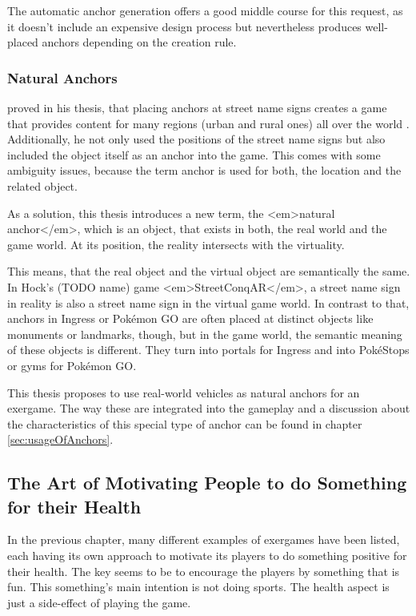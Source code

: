 The automatic anchor generation offers a good middle course for this request, as it doesn’t include an expensive design process but nevertheless produces well-placed anchors depending on the creation rule.

\subsubsection{Natural Anchors}
\citeauthor{hock2014augmented} proved in his thesis, that placing anchors at street name signs creates a game that provides content for many regions (urban and rural ones) all over the world \cite{hock2014augmented}. Additionally, he not only used the positions of the street name signs but also included the object itself as an anchor into the game. This comes with some ambiguity issues, because the term anchor is used for both, the location and the related object.

As a solution, this thesis introduces a new term, the <em>natural anchor</em>, which is an object, that exists in both, the real world and the game world. At its position, the reality intersects with the virtuality.

This means, that the real object and the virtual object are semantically the same. In Hock’s (TODO name) game <em>StreetConqAR</em>, a street name sign in reality is also a street name sign in the virtual game world. In contrast to that, anchors in Ingress or Pokémon GO are often placed at distinct objects like monuments or landmarks, though, but in the game world, the semantic meaning of these objects is different. They turn into portals for Ingress and into PokéStops or gyms for Pokémon GO.

This thesis proposes to use real-world vehicles as natural anchors for an exergame. The way these are integrated into the gameplay and a discussion about the characteristics of this special type of anchor can be found in chapter \ref{sec:usageOfAnchors}.

\subsection{The Art of Motivating People to do Something for their Health}
In the previous chapter, many different examples of exergames have been listed, each having its own approach to motivate its players to do something positive for their health. The key seems to be to encourage the players by something that is fun. This something’s main intention is not doing sports. The health aspect is just a side-effect of playing the game.

